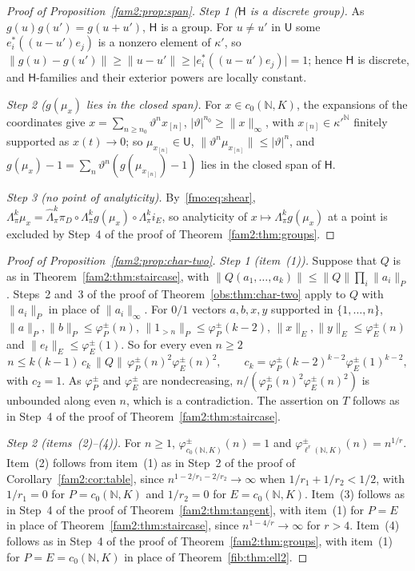 \documentclass[11pt]{amsart}
\theoremstyle{definition}
\theoremstyle{remark}
\numberwithin{equation}{section}
\newcommand{\N}{\mathbb N}
\newcommand{\abs}[1]{\lvert #1\rvert}
\newcommand{\norm}[1]{\lVert #1\rVert}
\theoremstyle{plain}
\theoremstyle{definition}
\theoremstyle{plain}
\newcommand{\hLambda}{\widehat\Lambda}
\begin{document}
\begin{proof}[Proof of Proposition~\ref{fam2:prop:span}]
\emph{Step 1 ($\mathsf H$ is a discrete group).} As $g(u)g(u')=g(u+u')$, $\mathsf H$ is a group. For $u\ne u'$ in
$\mathsf U$ some $e_i^*((u-u')e_j)$ is a nonzero element of $\kappa'$, so
$\norm{g(u)-g(u')}\ge\norm{u-u'}\ge\abs{e_i^*((u-u')e_j)}=1$; hence $\mathsf H$ is discrete, and $\mathsf H$-families and
their exterior powers are locally constant.

\emph{Step 2 ($g(\mu_x)$ lies in the closed span).} For $x\in c_0(\N,K)$, the expansions of the coordinates give
$x=\sum_{n\ge n_0}\vartheta^nx_{[n]}$, $\abs\vartheta^{n_0}\ge\norm x_\infty$, with $x_{[n]}\in\kappa'^{\N}$ finitely supported
as $x(t)\to0$; so $\mu_{x_{[n]}}\in\mathsf U$, $\norm{\vartheta^n\mu_{x_{[n]}}}\le\abs\vartheta^n$, and $g(\mu_x)-1=
\sum_n\vartheta^n(g(\mu_{x_{[n]}})-1)$ lies in the closed span of $\mathsf H$.

\emph{Step 3 (no point of analyticity).} By~\eqref{fmo:eq:shear},
$\Lambda^k_\pi\mu_x=\hLambda^k_\pi\pi_D\circ\Lambda^k_\pi g(\mu_x)\circ\Lambda^k_\pi i_E$, so analyticity of
$x\mapsto\Lambda^k_\pi g(\mu_x)$ at a point is excluded by Step~4 of the proof of Theorem~\ref{fam2:thm:groups}.
\end{proof}

\begin{proof}[Proof of Proposition~\ref{fam2:prop:char-two}]
\emph{Step 1 (item~(1)).} Suppose that $Q$ is as in Theorem~\ref{fam2:thm:staircase}, with
$\norm{Q(a_1,\dots,a_k)}\le\norm Q\prod_i\norm{a_i}_P$. Steps~2 and~3 of the proof of Theorem~\ref{obs:thm:char-two}
apply to $Q$ with $\norm{a_i}_P$ in place of $\norm{a_i}_\infty$. For $0/1$ vectors $a,b,x,y$ supported in
$\{1,\dots,n\}$, $\norm a_P,\norm b_P\le\varphi^\pm_P(n)$, $\norm{1_{>n}}_P\le\varphi^\pm_P(k-2)$,
$\norm x_E,\norm y_E\le\varphi^\pm_E(n)$ and $\norm{e_t}_E\le\varphi^\pm_E(1)$. So for every even $n\ge2$
\[
 n\le k(k-1)\,c_k\,\norm Q\,\varphi^\pm_P(n)^2\varphi^\pm_E(n)^2,\qquad
 c_k=\varphi^\pm_P(k-2)^{k-2}\varphi^\pm_E(1)^{k-2},
\]
with $c_2=1$. As $\varphi^\pm_P$ and $\varphi^\pm_E$ are nondecreasing, $n/(\varphi^\pm_P(n)^2\varphi^\pm_E(n)^2)$ is
unbounded along even $n$, which is a contradiction. The assertion on $T$ follows as in Step~4 of the proof of
Theorem~\ref{fam2:thm:staircase}.

\emph{Step 2 (items~(2)--(4)).} For $n\ge1$, $\varphi^\pm_{c_0(\N,K)}(n)=1$ and $\varphi^\pm_{\ell^r(\N,K)}(n)=n^{1/r}$.
Item~(2) follows from item~(1) as in Step~2 of the proof of Corollary~\ref{fam2:cor:table}, since
$n^{1-2/r_1-2/r_2}\to\infty$ when $1/r_1+1/r_2<1/2$, with $1/r_1=0$ for $P=c_0(\N,K)$ and $1/r_2=0$ for $E=c_0(\N,K)$.
Item~(3) follows as in Step~4 of the proof of Theorem~\ref{fam2:thm:tangent}, with item~(1) for $P=E$ in place of
Theorem~\ref{fam2:thm:staircase}, since $n^{1-4/r}\to\infty$ for $r>4$. Item~(4) follows as in Step~4 of the proof of
Theorem~\ref{fam2:thm:groups}, with item~(1) for $P=E=c_0(\N,K)$ in place of Theorem~\ref{fib:thm:ell2}.
\end{proof}
\end{document}
